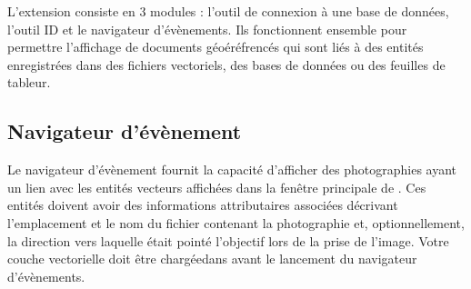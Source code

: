 
L'extension consiste en 3 modules : l'outil de connexion à une base de données, l'outil ID et le navigateur d'évènements. Ils fonctionnent ensemble pour permettre l'affichage de documents géoéréfrencés qui sont liés à des entités enregistrées dans des fichiers vectoriels, des bases de données ou des feuilles de tableur.

\subsection{Navigateur d'évènement}\label{evis_browser}


Le navigateur d'évènement fournit la capacité d'afficher des photographies ayant un lien avec les entités vecteurs affichées dans la fenêtre principale de \qg. Ces entités doivent avoir des informations attributaires associées décrivant l'emplacement et le nom du fichier contenant la photographie et, optionnellement, la direction vers laquelle était pointé l'objectif lors de la prise de l'image. Votre couche vectorielle doit être chargéedans \qg avant le lancement du navigateur d'évènements.

\label{evis_launch_browser}


